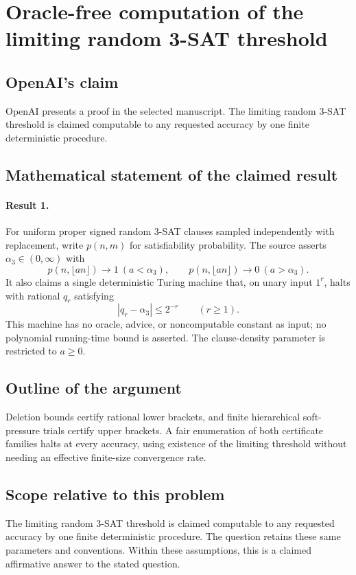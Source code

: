 \documentclass[11pt]{article}
\begin{document}
\section*{Oracle-free computation of the limiting random 3-SAT threshold}

\subsection{OpenAI's claim}
OpenAI presents a proof in the selected manuscript. The limiting random 3-SAT threshold is claimed computable to any requested accuracy by one finite deterministic procedure.

\subsection{Mathematical statement of the claimed result}
\paragraph{Result 1.} For uniform proper signed random 3-SAT clauses sampled independently with replacement, write \(p(n,m)\) for satisfiability probability. The source asserts \(\alpha_3\in(0,\infty)\) with
\[
 p(n,\lfloor an\rfloor)\to1\ (a<\alpha_3),\qquad
 p(n,\lfloor an\rfloor)\to0\ (a>\alpha_3).
\]
It also claims a single deterministic Turing machine that, on unary input \(1^r\), halts with rational \(q_r\) satisfying
\[
 |q_r-\alpha_3|\le2^{-r}\qquad(r\ge1).
\]
This machine has no oracle, advice, or noncomputable constant as input; no polynomial running-time bound is asserted. The clause-density parameter is restricted to $a\ge0$.

\subsection{Outline of the argument}
Deletion bounds certify rational lower brackets, and finite hierarchical soft-pressure trials certify upper brackets. A fair enumeration of both certificate families halts at every accuracy, using existence of the limiting threshold without needing an effective finite-size convergence rate.

\subsection{Scope relative to this problem}
The limiting random 3-SAT threshold is claimed computable to any requested accuracy by one finite deterministic procedure. The question retains these same parameters and conventions. Within these assumptions, this is a claimed affirmative answer to the stated question.
\end{document}
